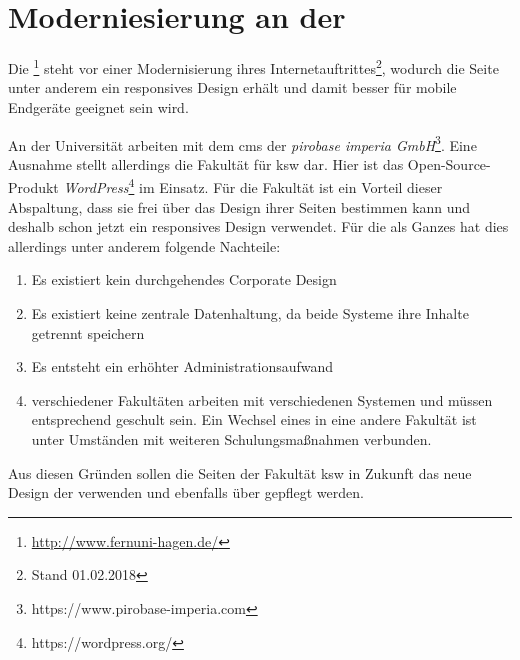     \section{Moderniesierung an der \fernUni}
        Die \fernUni\footnote{\url{http://www.fernuni-hagen.de/}}
        steht vor einer Modernisierung ihres Internetauftrittes\footnote{Stand 01.02.2018},
        wodurch die Seite unter anderem ein responsives Design erhält und damit besser für
        mobile Endgeräte geeignet sein wird.

        An der Universität arbeiten \editors mit dem \gls{cms} \textit{\imperia}
        der \textit{pirobase imperia GmbH}\footnote{https://www.pirobase-imperia.com}.
        Eine Ausnahme stellt allerdings die Fakultät für \gls{ksw} dar.
        Hier ist das Open-Source-Produkt \textit{WordPress}\footnote{https://wordpress.org/} im Einsatz.
        Für die Fakultät ist ein Vorteil dieser Abspaltung,
        dass sie frei über das Design ihrer Seiten bestimmen kann
        und deshalb schon jetzt ein responsives Design verwendet.
        Für die \fernUni als Ganzes hat dies allerdings unter anderem folgende Nachteile:

        \begin{enumerate}
            \item   Es existiert kein durchgehendes Corporate Design
            \item   Es existiert keine zentrale Datenhaltung, da beide Systeme ihre Inhalte getrennt speichern
            \item   Es entsteht ein erhöhter Administrationsaufwand
            \item   \editors verschiedener Fakultäten arbeiten mit verschiedenen Systemen und müssen entsprechend geschult sein.
                    Ein Wechsel eines \editors in eine andere Fakultät ist unter Umständen mit weiteren Schulungsmaßnahmen verbunden.
        \end{enumerate}

        Aus diesen Gründen sollen die Seiten der Fakultät \gls{ksw}
        in Zukunft das neue Design der \fernUni verwenden und ebenfalls
        über \imperia gepflegt werden.
